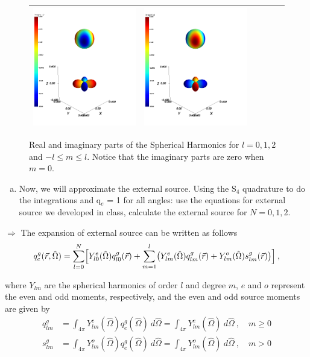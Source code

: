 \documentclass[10pt]{article}
\begin{document}
\begin{figure}[H]
\begin{tabular}{|c|c|c|c|c|c|}
    \includegraphics[height=0.17\textwidth]{Figures/y2-2_i.png} &
    \includegraphics[height=0.17\textwidth]{Figures/y22_i.png} \\ \hline
    \end{tabular}
    \caption{Real and imaginary parts of the Spherical Harmonics for $l=0,1,2$ and $-l \leq m \leq l$. Notice that the imaginary parts are zero when $m=0$.}
    \label{fig1}
\end{figure}






\newpage
\begin{enumerate}[(b)]
    \item Now, we will approximate the external source. Using the S$_4$ quadrature to do the integrations and q$_e$ = 1 for all angles: use the equations for external source we developed in class, calculate the external source for $N = 0, 1, 2$.\\[-5pt]
\end{enumerate}


$\Rightarrow$ The expansion of external source can be written as follows
%
\begin{equation*}
  q^g_e(\vec{r}, \hat{\Omega}) = \sum_{l=0}^{N}\Bigl[Y^e_{l0}(\hat{\Omega})q^g_{l0}(\vec{r}) + \sum_{m=1}^{l}\bigr(Y^e_{lm}(\hat{\Omega})q^g_{lm}(\vec{r}) + Y^o_{lm}(\hat{\Omega})s^g_{lm}(\vec{r})\bigr)\Bigr]\:,
\end{equation*}

where $Y_{lm}$ are the spherical harmonics of order $l$ and degree $m$, $e$ and $o$ represent the even and odd moments, respectively, and the even and odd source moments are given by
%
\begin{align*}
  q^g_{lm} &= \int_{4\pi}Y^e_{lm}(\hat{\Omega})q^g_e(\hat{\Omega})\:d\hat{\Omega} = \int_{4\pi}Y^e_{lm}(\hat{\Omega})\:d\hat{\Omega}\:, \quad m\ge 0 \\
  s^g_{lm} &= \int_{4\pi}Y^o_{lm}(\hat{\Omega})q^g_e(\hat{\Omega})\:d\hat{\Omega} = \int_{4\pi}Y^o_{lm}(\hat{\Omega})\:d\hat{\Omega} \:, \quad m>0
\end{align*}
\end{document}
